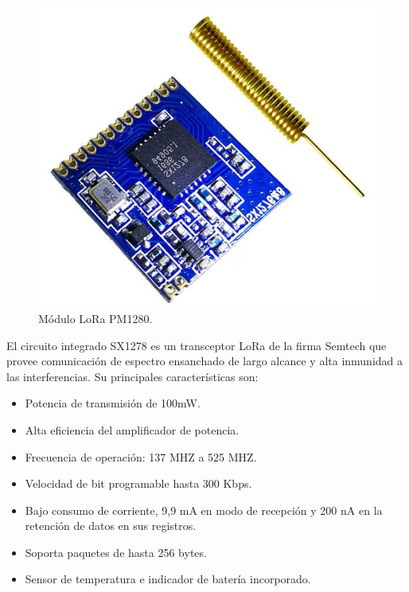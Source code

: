 \begin{figure}[h]
	\centering
	\includegraphics[scale=0.3]{./Figures/pm1280.jpg}
	\caption{Módulo LoRa PM1280\protect\footnotemark.}
		\label{fig:loraModule}
\end{figure}


El circuito integrado SX1278 es un transceptor LoRa de la firma Semtech que provee comunicación de espectro ensanchado de largo alcance y alta inmunidad a las interferencias. Su principales características son:

\begin{itemize}
	\item Potencia de transmisión de 100mW.
	\item Alta eficiencia del amplificador de potencia.
	\item Frecuencia de operación: 137 MHZ a 525 MHZ.
	\item Velocidad de bit programable hasta 300 Kbps.
	\item Bajo consumo de corriente, 9,9 mA en modo de recepción y 200 nA en la retención de datos en sus registros.
	\item Soporta paquetes de hasta 256 bytes.
	\item Sensor de temperatura e indicador de batería incorporado.
\end{itemize}



